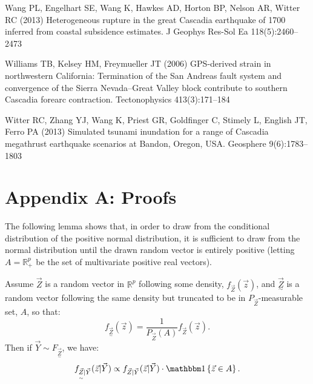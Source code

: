 {\begin{thebibliography}{33}
Wang PL, Engelhart SE, Wang K, Hawkes AD, Horton BP, Nelson AR, Witter RC
  (2013) Heterogeneous rupture in the great {C}ascadia earthquake of 1700
  inferred from coastal subsidence estimates. J Geophys Res-Sol Ea
  118(5):2460--2473

Williams TB, Kelsey HM, Freymueller JT (2006) {GPS}-derived strain in
  northwestern {C}alifornia: Termination of the {S}an {A}ndreas fault system
  and convergence of the {S}ierra {N}evada--{G}reat {V}alley block contribute
  to southern {C}ascadia forearc contraction. Tectonophysics 413(3):171--184

Witter RC, Zhang YJ, Wang K, Priest GR, Goldfinger C, Stimely L, English JT,
  Ferro PA (2013) Simulated tsunami inundation for a range of {C}ascadia
  megathrust earthquake scenarios at {B}andon, {O}regon, {USA}. Geosphere
  9(6):1783--1803

\end{thebibliography}



\section*{Appendix A: Proofs}

The following lemma shows that, in order to draw from the conditional distribution of the positive normal distribution, it is sufficient to draw from the normal distribution until the drawn random vector is entirely positive (letting $A = \mathbb{R}_+^p$ be the set of multivariate positive real vectors).
\begin{lemma}
Assume $\vec{Z}$ is a random vector in $\mathbb{R}^p$ following some density, $f_{\vec{Z}}(\vec{z})$, and $\underset{\sim}{\vec{Z}}$ is a random vector following the same density but truncated to be in $P_{\vec{Z}}$-measurable set, $A$, so that:
$$ f_{\underset{\sim}{\vec{Z}}}(\vec{z}) = \frac{1}{P_{\vec{Z}}(A)} f_{\vec{Z}}(\vec{z}). $$
Then if $\vec{Y} \sim F_{\underset{\sim}{\vec{Z}}}$, we have:
$$ f_{\underset{\sim}{\vec{Z}} \vert \vec{Y}}(\vec{z} \vert \vec{Y}) \propto f_{\vec{Z} \vert \vec{Y}}(\vec{z} \vert \vec{Y}) \cdot \ind\set{\vec{z} \in A}. $$
\end{lemma}

}
